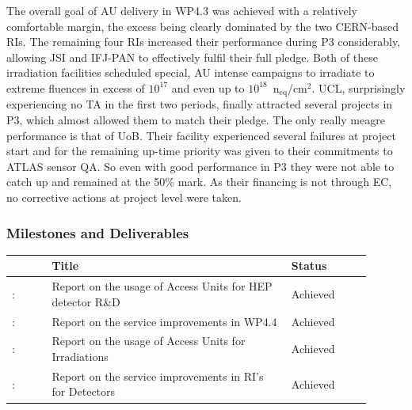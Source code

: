 The overall goal of AU delivery in WP4.3 was achieved with a relatively comfortable margin, the excess being clearly dominated by the two CERN-based RIs. The remaining four RIs increased their performance during P3 considerably, allowing JSI and IFJ-PAN to effectively fulfil their full pledge. Both of these irradiation facilities scheduled special, AU intense campaigns to irradiate to extreme fluences in excess of $10^{17}$ and even up to $10^{18}$~n$_{\mathrm{eq}}$/cm$^2$. UCL, surprisingly experiencing no TA in the first two periods, finally attracted several projects in P3, which almost allowed them to match their pledge. The only really meagre performance is that of UoB. Their facility experienced several failures at project start and  for the remaining up-time priority was given to their commitments to ATLAS sensor QA. So even with good performance in P3 they were not able to catch up and remained at the 50\% mark. As their financing is not through EC, no corrective actions at project level were taken.

\subsubsection*{Milestones and Deliverables}

{\fontsize{9}{11}\selectfont
\begin{center}
  {\color{black}\begin{tabular}[t]{!{\color{mygray}\vrule}p{0.10\linewidth}!
  {\color{mygray}\vrule}p{0.60\linewidth}!
  {\color{mygray}\vrule}p{0.20\linewidth}!{\color{mygray}\vrule} } \hline
     & {\bf Title} & {\bf Status} \\ \hline
    : & Report on the usage of Access Units for HEP detector R\&D &  Achieved \\ \hline
    : & Report on the service improvements in WP4.4 &  Achieved \\ \hline
    : & Report on the usage of Access Units for Irradiations &  Achieved \\ \hline
    : & Report on the service improvements in RI’s for Detectors &  Achieved \\ \hline
  \end{tabular}}
\end{center}
}


